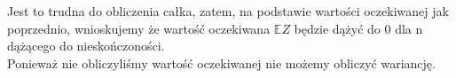 \documentclass{article}
\begin{document}
Jest to trudna do obliczenia całka, zatem, na podstawie wartości oczekiwanej jak poprzednio, wnioskujemy że wartość oczekiwana $\mathbb{E}Z$ będzie dążyć do 0 dla n dążącego do nieskończoności. \\
Ponieważ nie obliczyliśmy wartość oczekiwanej nie możemy obliczyć wariancję.

\begin{comment}
&\begin{array}{c|c|c}
\hline
& D & I \\
+ & x & n\cdot \Big(1 - \frac{x^2}{16} \Big)^{n-1} \frac{x}{8} \\
- & 1 & - \Big(1 - \frac{x^2}{16} \Big)^n \\
\hline
\end{array} \\
& = - x \cdot \Big(1 - \frac{t^2}{16} \Big)^n + \int_{0}^{4}\Big(1 - \frac{x^2}{16} \Big)^n dx 
\end{comment}
\end{document}
